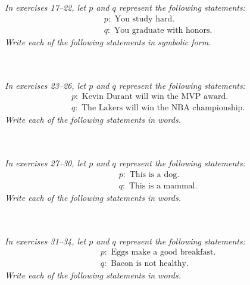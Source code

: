 \begin{exercises}
\\ \\

\textit{In exercises 17--22, let $p$ and $q$ represent the following statements:}
\begin{align*}
&p: \textrm{ You study hard.}\\
&q: \textrm{ You graduate with honors.}
\end{align*}
\textit{Write each of the following statements in symbolic form.}


\\ \\

\textit{In exercises 23--26, let $p$ and $q$ represent the following statements:}
\begin{align*}
&p: \textrm{ Kevin Durant will win the MVP award.}\\
&q: \textrm{ The Lakers will win the NBA championship.}
\end{align*}
\textit{Write each of the following statements in words.}

\\ \\

\textit{In exercises 27--30, let $p$ and $q$ represent the following statements:}
\begin{align*}
&p: \textrm{ This is a dog.}\\
&q: \textrm{ This is a mammal.}
\end{align*}
\textit{Write each of the following statements in words.}

\\ \\

\textit{In exercises 31--34, let $p$ and $q$ represent the following statements:}
\begin{align*}
&p: \textrm{ Eggs make a good breakfast.}\\
&q: \textrm{ Bacon is not healthy.}
\end{align*}
\textit{Write each of the following statements in words.}


\end{exercises}
